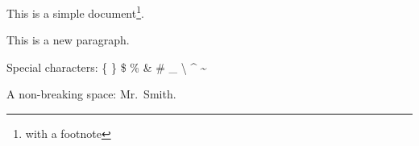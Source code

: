 \documentclass[a4paper,12pt]{article}
\begin{document}
This is   a simple document\footnote{with a footnote}.

This is a new paragraph.

Special characters:
\{ \} \$ \% \& \# \_
\textbackslash{}
\textasciicircum{}
\textasciitilde{}

A non-breaking space: Mr.~Smith.
\end{document}
